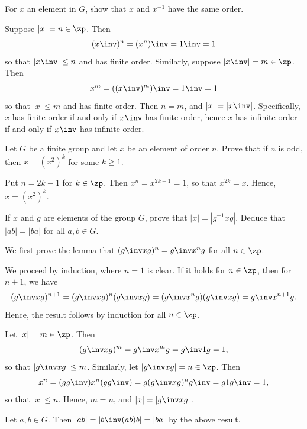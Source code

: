 \begin{exercise}\label{ex1.1.20}
    For $x$ an element in $G$, show that $x$ and $x^{-1}$ have the same order.
\end{exercise}

\begin{sol}
    Suppose $|x| = n \in \zp$. Then
    \[(x\inv)^n = (x^n)\inv = 1\inv = 1\]
    so that $|x\inv| \leq n$ and has finite order. Similarly, suppose $|x\inv| = m \in \zp$. Then
    \[x^m = ((x\inv)^m)\inv = 1\inv = 1\]
    so that $|x| \leq m$ and has finite order. Then $n = m$, and $|x| = |x\inv|$. Specifically, $x$ has finite order if and only if $x\inv$ has finite order, hence $x$ has infinite order if and only if $x\inv$ has infinite order.
\end{sol}

\begin{exercise}\label{ex1.1.21}
    Let $G$ be a finite group and let $x$ be an element of order $n$. Prove that if $n$ is odd, then $x = (x^2)^k$ for some $k \geq 1$.
\end{exercise}

\begin{sol}
    Put $n = 2k - 1$ for $k \in \zp$. Then $x^n = x^{2k - 1} = 1$, so that $x^{2k} = x$. Hence, $x = (x^2)^k$.
\end{sol}

\begin{specialexercise} \label{ex1.1.22}
    If $x$ and $g$ are elements of the group $G$, prove that $|x| = |g^{-1} x g|$. Deduce that $|ab| = |ba|$ for all $a, b \in G$.
\end{specialexercise}

\begin{sol}
    We first prove the lemma that $(g\inv xg)^n = g\inv x^n g$ for all $n \in \zp$.
    \begin{lemma}
        We proceed by induction, where $n = 1$ is clear. If it holds for $n \in \zp$, then for $n + 1$, we have
        \[(g\inv xg)^{n + 1} = (g\inv xg)^n (g\inv xg) = (g\inv x^n g)(g\inv xg) = g\inv x^{n + 1} g.\]
        Hence, the result follows by induction for all $n \in \zp$.
    \end{lemma}
    Let $|x| = m \in \zp$. Then
    \[(g\inv xg)^m = g\inv x^m g = g\inv 1 g = 1,\]
    so that $|g\inv xg| \leq m$. Similarly, let $|g\inv xg| = n \in \zp$. Then
    \[x^n = (gg\inv) x^n (gg\inv) = g(g\inv xg)^n g\inv = g 1 g\inv = 1,\]
    so that $|x| \leq n$. Hence, $m = n$, and $|x| = |g\inv x g|$.

    Let $a, b \in G$. Then $|ab| = |b\inv (ab) b| = |ba|$ by the above result.
\end{sol}

